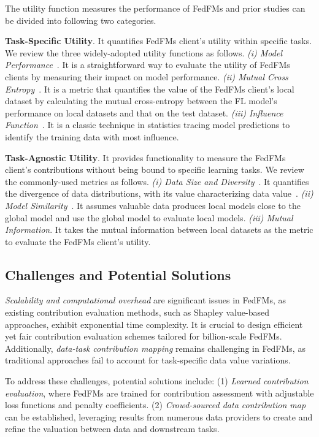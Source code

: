 The utility function measures the performance of FedFMs and prior studies can be divided into following two categories.



\textbf{Task-Specific Utility}. 
It quantifies FedFMs client's utility within specific tasks.
We review the three widely-adopted utility functions as follows.
    \textit{(i) Model Performance}~\cite{RN35}.
    It is a straightforward way to evaluate the utility of FedFMs clients by measuring their impact on model performance.
    \textit{(ii) Mutual Cross Entropy}~\cite{RN4}. It is a metric that quantifies the value of the FedFMs client's local dataset by calculating the mutual cross-entropy between the FL model's performance on local datasets and that on the test dataset.
    \textit{(iii) Influence Function}~\cite{RN12, RN13}. It is a classic technique in statistics tracing model predictions to identify the training data with most influence.
    

\textbf{Task-Agnostic Utility}. It provides functionality to measure the FedFMs client's contributions without being bound to specific learning tasks.
We review the commonly-used metrics as follows.
    \textit{(i) Data Size and Diversity}~\cite{RN15}. It quantifies the divergence of data distributions, with its value characterizing data value~\cite{RN16}. 
     \textit{(ii) Model Similarity}~\cite{RN18}. It assumes valuable data produces local models close to the global model and use the global model to evaluate local models.
    \textit{(iii) Mutual Information}. It takes the mutual information between local datasets 
    as the metric to evaluate the  FedFMs client's utility. 




\subsection{Challenges and Potential Solutions}

\textit{Scalability and computational overhead} are significant issues in FedFMs, as existing contribution evaluation methods, such as Shapley value-based approaches, exhibit exponential time complexity. It is crucial to design efficient yet fair contribution evaluation schemes tailored for billion-scale FedFMs. Additionally, \textit{data-task contribution mapping} remains challenging in FedFMs, as traditional approaches fail to account for task-specific data value variations.

To address these challenges, potential solutions include: (1) \textit{Learned contribution evaluation}, where FedFMs are trained for contribution assessment with adjustable loss functions and penalty coefficients. (2) \textit{Crowd-sourced data contribution map} can be established, leveraging results from numerous data providers to create and refine the valuation between data and downstream tasks.


